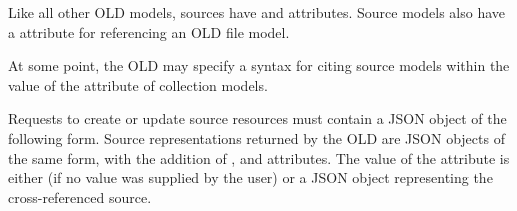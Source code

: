 \documentclass[letterpaper,10pt,english]{sphinxmanual}
\begin{document}
Like all other OLD models, sources have  and 
attributes.  Source models also have a  attribute for referencing an OLD
file model.

At some point, the OLD may specify a syntax for citing source models within the
value of the  attribute of collection models.

Requests to create or update source resources must contain a JSON object of
the following form.  Source representations returned by the OLD are JSON objects
of the same form, with the addition of ,  and
  attributes.  The value of the  attribute
is either  (if no  value was supplied by the user) or a JSON
object representing the cross-referenced source.
\end{document}
